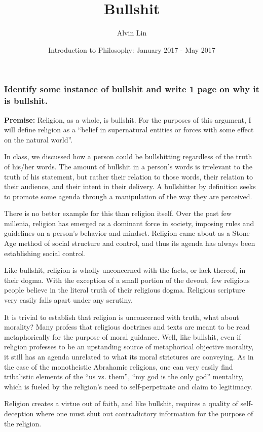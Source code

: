 \documentclass[letterpaper, 12pt]{article}
\title{Bullshit}
\author{Alvin Lin}
\date{Introduction to Philosophy: January 2017 - May 2017}
\begin{document}
\maketitle

\subsubsection*{Identify some instance of bullshit and write 1 page on why it
is bullshit.}

\textbf{Premise:} Religion, as a whole, is bullshit. For the purposes of this
argument, I will define religion as a ``belief in supernatural entities or
forces with some effect on the natural world''.

In class, we discussed how a person could be bullshitting regardless of the
truth of his/her words. The amount of bullshit in a person's words is irrelevant
to the truth of his statement, but rather their relation to those words, their
relation to their audience, and their intent in their delivery. A bullshitter
by definition seeks to promote some agenda through a manipulation of the
way they are perceived. \par
There is no better example for this than religion itself. Over the past few
millenia, religion has emerged as a dominant force in society, imposing rules
and guidelines on a person's behavior and mindset. Religion came about as a
Stone Age method of social structure and control, and thus its agenda has
always been establishing social control. \par
Like bullshit, religion is wholly unconcerned with the facts, or lack
thereof, in their dogma. With the exception of a small portion of the devout,
few religious people believe in the literal truth of their religious dogma.
Religious scripture very easily falls apart under any scrutiny. \par
It is trivial to establish that religion is unconcerned with truth, what about
morality? Many profess that religious doctrines and texts are meant to be read
metaphorically for the purpose of moral guidance. Well, like bullshit, even if
religion professes to be an upstanding source of metaphorical objective
morality, it still has an agenda unrelated to what its moral strictures are
conveying. As in the case of the monotheistic Abrahamic religions, one can very
easily find tribalistic elements of the ``us vs. them'', ``my god is the only
god'' mentality, which is fueled by the religion's need to self-perpetuate and
claim to legitimacy. \par
Religion creates a virtue out of faith, and like bullshit, requires a quality
of self-deception where one must shut out contradictory information for the
purpose of the religion.
\end{document}
